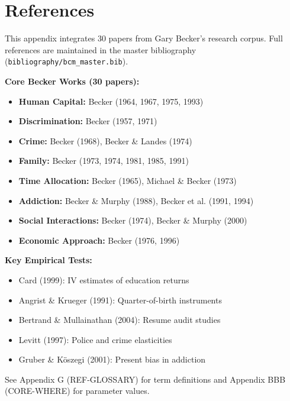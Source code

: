 \section{References}
\label{sec:gb-references}

\nocite{bcm_master}

This appendix integrates 30 papers from Gary Becker's research corpus. Full references are maintained in the master bibliography (\texttt{bibliography/bcm\_master.bib}).

\textbf{Core Becker Works (30 papers):}
\begin{itemize}
    \item \textbf{Human Capital:} Becker (1964, 1967, 1975, 1993)
    \item \textbf{Discrimination:} Becker (1957, 1971)
    \item \textbf{Crime:} Becker (1968), Becker \& Landes (1974)
    \item \textbf{Family:} Becker (1973, 1974, 1981, 1985, 1991)
    \item \textbf{Time Allocation:} Becker (1965), Michael \& Becker (1973)
    \item \textbf{Addiction:} Becker \& Murphy (1988), Becker et al. (1991, 1994)
    \item \textbf{Social Interactions:} Becker (1974), Becker \& Murphy (2000)
    \item \textbf{Economic Approach:} Becker (1976, 1996)
\end{itemize}

\textbf{Key Empirical Tests:}
\begin{itemize}
    \item Card (1999): IV estimates of education returns
    \item Angrist \& Krueger (1991): Quarter-of-birth instruments
    \item Bertrand \& Mullainathan (2004): Resume audit studies
    \item Levitt (1997): Police and crime elasticities
    \item Gruber \& K\"{o}szegi (2001): Present bias in addiction
\end{itemize}

See Appendix G (REF-GLOSSARY) for term definitions and Appendix BBB (CORE-WHERE) for parameter values.



